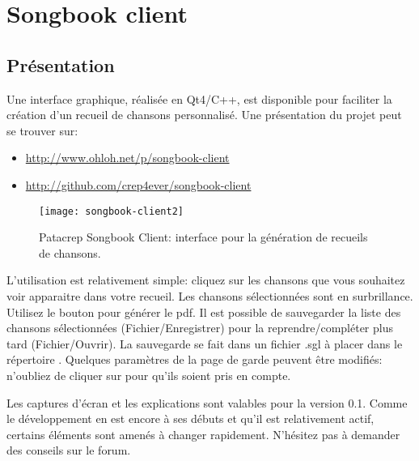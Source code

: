 \documentclass[versionenligne]{patacrep}
\newcommand{\Touche}[1]{\Ovalbox{#1}}
\begin{document}
\section{Songbook client}

\subsection{Présentation}

Une interface graphique, réalisée en Qt4/C++, est disponible pour
faciliter la création d'un recueil de chansons personnalisé.
Une présentation du projet peut se trouver sur:
\begin{itemize}
\item \url{http://www.ohloh.net/p/songbook-client}
\item \url{http://github.com/crep4ever/songbook-client}
\end{itemize}

\begin{figure}[h]
  \centering
  \texttt{[image: songbook-client2]}
  \caption{Patacrep Songbook Client: interface pour la génération de recueils de chansons.}
  \label{fig:sb-client}
\end{figure}

L'utilisation est relativement simple: cliquez sur les chansons que
vous souhaitez voir apparaitre dans votre recueil.  Les chansons
sélectionnées sont en surbrillance. Utilisez le bouton
\Touche{Générer} pour générer le pdf. Il est possible de sauvegarder
la liste des chansons sélectionnées (Fichier/Enregistrer) pour la
reprendre/compléter plus tard (Fichier/Ouvrir). La sauvegarde se fait
dans un fichier .sgl à placer dans le répertoire
. Quelques paramètres de la page de garde peuvent
être modifiés: n'oubliez de cliquer sur \Touche{Appliquer} pour qu'ils
soient pris en compte.

\begin{nota}
  Les captures d'écran et les explications sont valables pour la version
  0.1. Comme le développement en est encore à ses débuts et qu'il est
  relativement actif, certains éléments sont amenés à changer
  rapidement. N'hésitez pas à demander des conseils sur le forum.
\end{nota}
\end{document}
